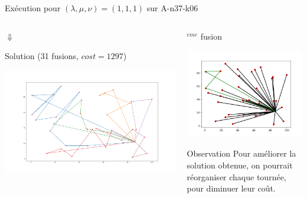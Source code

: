 \documentclass{beamer}
\begin{document}
\begin{frame}{Exécution pour $(\lambda,\mu,\nu) = (1,1,1)$ sur A-n37-k06}
\begin{columns}[t]
\begin{column}{4cm}
 	 \centering
 $\Downarrow$
 
 Solution (31 fusions, $cost = 1297$)
 
 \includegraphics[scale=0.09]{resCW101010.png}
  \end{column}


  \begin{column}{4cm}
  	$^{eme}$ fusion
  	
	\includegraphics[scale=0.2]{CW2.png}
 	
	
	\begin{block}{Observation}
	Pour améliorer la solution obtenue, on pourrait réorganiser chaque tournée, pour diminuer leur coût.
	\end{block}
  \end{column}
 \end{columns}
 
 


\end{frame}
\end{document}
